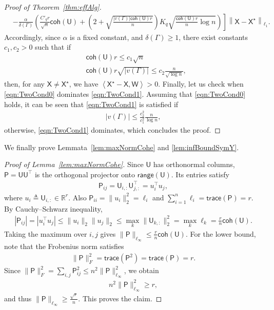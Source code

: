 \documentclass[12pt]{article}
\newcommand{\p}[1]{\left(#1\right)}
\newcommand{\norm}[1]{\left\|#1\right\|}
\newcommand{\innerP}[1]{\left\langle#1\right\rangle}
\newcommand{\s}[1]{\mathsf{#1}}
\begin{document}
\begin{proof}[Proof of Theorem~\ref{thm:effAlg}]
\begin{align}
    &\left.
    -\frac{\alpha}{\delta(\Gamma)}\left(
    \frac{C'_qr}{\sqrt n}\s{coh}(\s{U})
    + \p{2 + \sqrt{ \frac{|v(\Gamma)| \s{coh}(\s{U})r}{n}}}K_q\sqrt{\frac{\s{coh}(\s{U}) r}{n} \log n}
    \right)\right]\norm{\s{X}-\s{X}^\star}_{\ell_1}.
\end{align}
Accordingly, since $\alpha$ is a fixed constant, and $\delta(\Gamma)\geq1$, there exist constants $c_1,c_2>0$ such that if
\begin{align}
    &\s{coh}(\s{U})r\leq c_1\sqrt{n}\label{eqn:TwoCond0}\\
    &\s{coh}(\s{U})r\sqrt{|v(\Gamma)|}\leq c_2\frac{n}{\sqrt{\log n}},\label{eqn:TwoCond1}
\end{align}
then, for any $\s{X}\neq\s{X}^\star$, we have $\innerP{\s{X}^\star-\s{X},\s{W}}>0$. Finally, let us check when \eqref{eqn:TwoCond0} dominates \eqref{eqn:TwoCond1}. Assuming that \eqref{eqn:TwoCond0} holds, it can be seen that \eqref{eqn:TwoCond1} is satisfied if 
\begin{align}
    |v(\Gamma)|\leq \frac{c_2^2}{c_1^2}\frac{n}{\log n},
\end{align}
otherwise, \eqref{eqn:TwoCond1} dominates, which concludes the proof.
\end{proof}

We finally prove Lemmata~\ref{lem:maxNormCohe} and \ref{lem:infBoundSymY}.
\begin{proof}[Proof of Lemma~\ref{lem:maxNormCohe}]
Since $\s{U}$ has orthonormal columns, $\s{P}=\s{U}\s{U}^{\top}$ is the orthogonal projector onto $\s{range}(\s{U})$. Its entries satisfy
\begin{align}
\s{P}_{ij} = \s{U}_{i,:}\s{U}_{j,:}^{\top} = u_i^{\top}u_j,
\end{align}
where $u_i\triangleq \s{U}_{i,:}\in\mathbb{R}^r$. Also $\s{P}_{ii}=\|u_i\|_2^2=\ell_i$ and $\sum_{i=1}^n\ell_i=\s{trace}(\s{P})=r$. By Cauchy--Schwarz inequality,
\begin{align}
|\s{P}_{ij}| = |u_i^{\top}u_j|
\leq \|u_i\|_2\|u_j\|_2
\leq \max_k \|\s{U}_{k,:}\|_2^2
= \max_k \ell_k
= \frac{r}{n}\s{coh}(\s{U}).
\end{align}
Taking the maximum over $i,j$ gives $\|\s{P}\|_{\ell_\infty}\leq\frac{r}{n}\s{coh}(\s{U})$. For the lower bound, note that the Frobenius norm satisfies
\begin{align}
\|\s{P}\|_F^2
= \s{trace}(\s{P}^2)
= \s{trace}(\s{P})
= r.
\end{align}
Since $\|\s{P}\|_F^2 = \sum_{i,j} \s{P}_{ij}^2 \leq n^2 \|\s{P}\|_{\ell_\infty}^2$, we obtain
\begin{align}
n^2 \|\s{P}\|_{\ell_\infty}^2 \geq r,
\end{align}
and thus $\|\s{P}\|_{\ell_\infty}\geq\frac{\sqrt{r}}{n}$. This proves the claim.
\end{proof}
\end{document}
